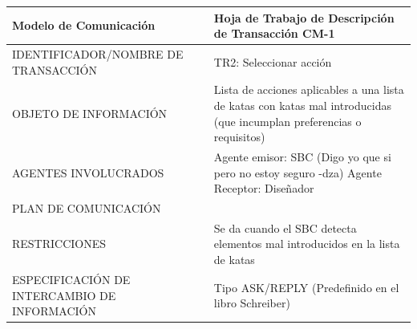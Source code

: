 \documentclass[12pt,a4paper,twoside,spanish]{article}      %
\begin{document}
\begin{table}[H]
\centering
\label{tab:cm1}
 
\begin{tabularx}{\textwidth}{|X|X|}
\hline
\textbf{Modelo de Comunicación} & \textbf{Hoja de Trabajo de Descripción de Transacción CM-1} \\
\hline
 
IDENTIFICADOR/NOMBRE DE TRANSACCIÓN & TR2: Seleccionar acción \\
\hline
 
OBJETO DE INFORMACIÓN & Lista de acciones aplicables a una lista de katas con katas mal introducidas (que incumplan preferencias o requisitos)
\\
\hline
 
AGENTES INVOLUCRADOS & Agente emisor: SBC (Digo yo que si pero no estoy seguro -dza) \newline Agente Receptor: Diseñador
  \\ 
\hline
 
PLAN DE COMUNICACIÓN & 
\\
\hline
 
RESTRICCIONES & Se da cuando el SBC detecta elementos mal introducidos en la lista de katas
\\
\hline
 
ESPECIFICACIÓN DE INTERCAMBIO DE INFORMACIÓN & Tipo ASK/REPLY (Predefinido en el libro Schreiber)
\\
\hline
 
\end{tabularx}
 
\end{table}
\end{document}
